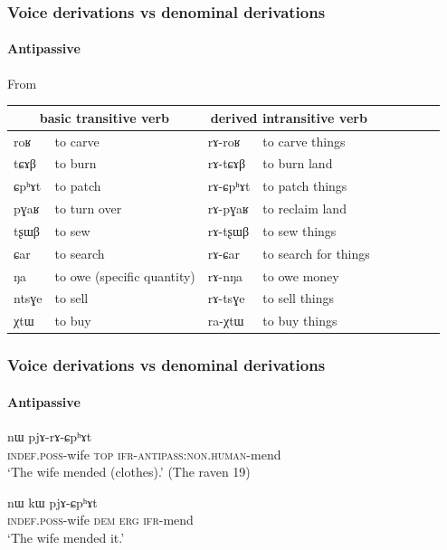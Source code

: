 \documentclass[xcolor=table]{beamer}
\newcommand{\ipa}[1]{{\phon \mbox{#1}}} %
\begin{document}
\begin{frame} 
\frametitle{Voice derivations vs denominal derivations} 
\framesubtitle{Antipassive} 

From \citet{jacques14antipassive}

\begin{tabular}{lllllllll} \toprule
\multicolumn{2}{c}{basic  transitive verb}  & \multicolumn{2}{c}{derived  intransitive verb}  \\
\midrule
\ipa{roʁ}   &	to carve &  	\ipa{rɤ-roʁ}   &	to carve things \\  
\ipa{tɕɤβ}   &	to burn &  	\ipa{rɤ-tɕɤβ}   &	to burn land \\  
\ipa{ɕpʰɤt}   &	to patch &  	\ipa{rɤ-ɕpʰɤt}   &	to patch things \\  
\ipa{pɣaʁ}   &	to turn over &  	\ipa{rɤ-pɣaʁ}   &	to reclaim land \\  
\ipa{tʂɯβ}   &	to sew &  	\ipa{rɤ-tʂɯβ}   &	 to sew things \\   
\ipa{ɕar}   &	to search &  	\ipa{rɤ-ɕar}   &	to search for things \\ 
\ipa{ŋa}   &	to owe  (specific quantity)&  	\ipa{rɤ-nŋa}   &	to owe money \\  
\ipa{ntsɣe}   &	to sell &  	\ipa{rɤ-tsɣe}   &	to sell things \\  
\ipa{χtɯ}   &	to buy &  	\ipa{ra-χtɯ}   &	to buy things \\  
\bottomrule
\end{tabular}
\end{frame}   

\begin{frame} 
\frametitle{Voice derivations vs denominal derivations} 
\framesubtitle{Antipassive} 
  \begin{exe}
\ex
\gll \ipa{tɤ-rʑaβ} 	\ipa{nɯ} 	\ipa{pjɤ-rɤ-ɕpʰɤt}   \\
    \textsc{indef.poss}-wife \textsc{top} \textsc{ifr-antipass:non.human}-mend \\
 \glt    `The wife mended (clothes).' (The raven 19)
\end{exe} 
 
   \begin{exe}
\ex
\gll \ipa{tɤ-rʑaβ} 	\ipa{nɯ} 	\ipa{kɯ}	\ipa{pjɤ-ɕpʰɤt}   \\
    \textsc{indef.poss}-wife \textsc{dem} \textsc{erg} \textsc{ifr}-mend \\
 \glt    `The wife mended it.' 
\end{exe} 

\end{frame}   
 
\end{document}

